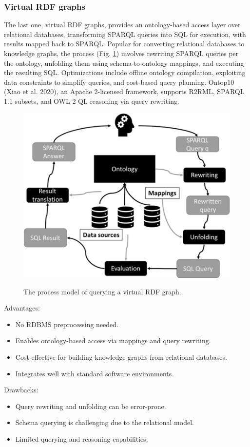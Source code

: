 \documentclass[12pt]{article}
\begin{document}
\subsubsection{Virtual RDF graphs}
The last one, virtual RDF graphs, provides an ontology-based access layer over relational databases, transforming SPARQL queries into SQL for execution, with results mapped back to SPARQL. Popular for converting relational databases to knowledge graphs, the process (Fig. \ref{fig:VirtualRDFgraphsalgorithm}) involves rewriting SPARQL queries per the ontology, unfolding them using schema-to-ontology mappings, and executing the resulting SQL. Optimizations include offline ontology compilation, exploiting data constraints to simplify queries, and cost-based query planning. Ontop10 (Xiao et al. 2020), an Apache 2-licensed framework, supports R2RML, SPARQL 1.1 subsets, and OWL 2 QL reasoning via query rewriting.
\begin{figure}
    \includegraphics[width=\linewidth]{imgs/Virtual RDF graphs algorithm.jpeg}
    \label{fig:VirtualRDFgraphsalgorithm}
    \caption{The process model of querying a virtual RDF graph.}
\end{figure}
\begin{multicols}{2}
    Advantages:
    \begin{itemize}
        \item No RDBMS preprocessing needed.
        \item Enables ontology-based access via mappings and query rewriting.
        \item Cost-effective for building knowledge graphs from relational databases.
        \item Integrates well with standard software environments.
    \end{itemize}
    \columnbreak
    Drawbacks:
    \begin{itemize}
        \item Query rewriting and unfolding can be error-prone.
        \item Schema querying is challenging due to the relational model.
        \item Limited querying and reasoning capabilities.
    \end{itemize}
\end{multicols}
\end{document}
